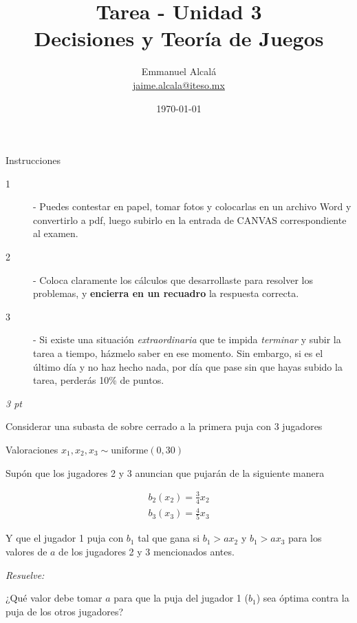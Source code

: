 \documentclass[12pt]{scrartcl} %
\title{Tarea - Unidad 3 \\ \normalsize Decisiones y Teoría de Juegos}
\author{Emmanuel Alcalá\\ \url{jaime.alcala@iteso.mx}}
\date{\today}
\begin{document}
\maketitle
\begin{summarybox}{Instrucciones}

  \begin{description}
      \item[1] - Puedes contestar en papel, tomar fotos y colocarlas en un archivo Word y convertirlo a pdf, luego subirlo en la entrada de CANVAS correspondiente al examen. 
      \item[2] - Coloca claramente los cálculos que desarrollaste para resolver los problemas, y \textbf{encierra en un recuadro} la respuesta correcta. 
      \item[3] - Si existe una situación \textit{extraordinaria} que te impida \textit{terminar} y subir la tarea a tiempo, házmelo saber en ese momento. Sin embargo, si es el último día y no haz hecho nada, por día que pase sin que hayas subido la tarea, perderás 10\% de puntos.
  \end{description}
  
\end{summarybox}

\begin{Exercise}[name=Pregunta]
\textit{3 pt}

  Considerar una subasta de sobre cerrado a la primera puja con 3 jugadores

  Valoraciones $ x_1, x_2, x_3 \sim \text{uniforme}(0, 30) $
  
  Supón que los jugadores 2 y 3 anuncian que pujarán de la siguiente manera

  \begin{align*}
    b_2(x_2) = \frac{3}{4}x_2 \\ 
    b_3(x_3) = \frac{4}{5}x_3
  \end{align*}

  Y que el jugador 1 puja con $ b_1 $ tal que gana si $ b_1 > ax_2 $ y $ b_1 > ax_3 $ para los valores de $a$ de los jugadores 2 y 3 mencionados antes.

  \textit{Resuelve:}

  ¿Qué valor debe tomar $ a $ para que la puja del jugador 1 ($ b_1 $) sea óptima contra la puja de los otros jugadores? 

\end{Exercise}
\end{document}
